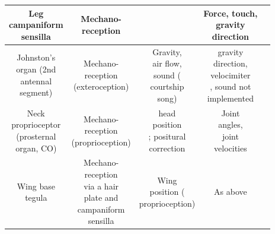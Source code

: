 \documentclass[sn-mathphys-num]{sn-jnl}%
\theoremstyle{thmstyleone}	%
\theoremstyle{thmstyletwo}	%
\theoremstyle{thmstylethree}	%
\begin{document}
\begin{appendices}
\begin{table}[htbp]
\begin{tabular}{ccccc}
		\midrule
		\makecell{Leg \\ campaniform\\sensilla}     &   \makecell{Mechano-\\reception}      &   \makecell{Load/gravity} & \makecell{Force, touch,\\ gravity\\ direction} & \cite{dinges2021location} \\
		\midrule
		\makecell{Johnston's\\ organ (2nd \\ antennal\\ segment)}     &   \makecell{Mechano-\\reception \\ (exteroception)}      &   \makecell{Gravity, \\air flow,\\sound (\\courtship\\ song)} & \makecell{gravity \\direction,\\ velocimiter\\, sound not \\implemented} & \cite{kamikouchi2009neural,mimura1970convergence,mamiya2015antennal} \\
		\midrule
		\makecell{Neck \\proprioceptor\\ (prosternal\\ organ, CO)}     &   \makecell{Mechano-\\reception \\ (proprioception)}      &   \makecell{head \\position\\; positural\\ correction} & \makecell{Joint \\angles, \\joint \\velocities} & \cite{strausfeld1985convergence} \\
		\midrule
		\makecell{Wing base \\tegula}     &   \makecell{Mechano-\\reception \\ via a hair \\plate and \\ campaniform\\ sensilla}      &   \makecell{Wing \\position (\\proprioception)} & As above & \cite{fudalewicz1963innervation} \\
		\bottomrule
	\end{tabular}%
	\label{tab:s_4}%
\end{table}%





\end{appendices}
\end{document}
